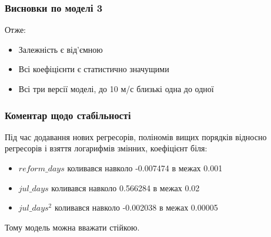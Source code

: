 \documentclass{beamer}
\begin{document}
\begin{frame}
  \frametitle{Висновки по моделі 3}
  
  Отже:
  
  \begin{itemize}
    \item Залежність є від'ємною
    \item Всі коефіцієнти є статистично значущими
    \item Всі три версії моделі, до 10 м/с близькі одна до одної
  \end{itemize}
\end{frame}

\begin{frame}
  \frametitle{Коментар щодо стабільності}
  
  Під час додавання нових регресорів, поліномів вищих порядків відносно регресорів і взяття логарифмів змінних, коефіцієнт біля:
   
  \begin{itemize}
    \item $reform\_days$ коливався навколо -0.007474 в межах 0.001
    \item $jul\_days$ коливався навколо 0.566284 в межах 0.02
    \item $jul\_days^2$ коливався навколо -0.002038 в межах 0.00005
  \end{itemize}
  
  Тому модель можна вважати стійкою.
\end{frame}
\end{document}
